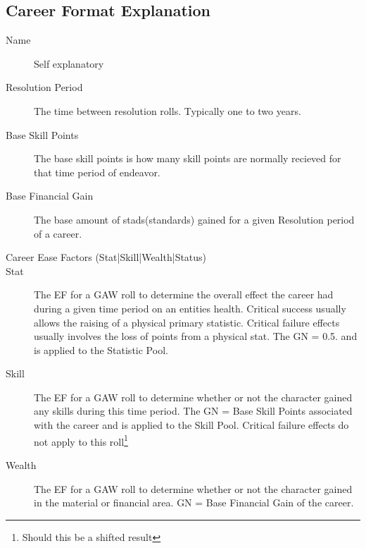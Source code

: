 \subsection{Career Format Explanation}
\begin{description}
	\item [Name]
	Self explanatory
	\item [Resolution Period]
	The time between resolution rolls. Typically one to two years.
	\item[Base Skill Points]
	The base skill points is how many skill points are
	normally recieved for that time period of endeavor.
	\item[Base Financial Gain]
	The base amount of stads(standards) gained for a given Resolution
	period of a career.
	\item[Career Ease Factors (Stat|Skill|Wealth|Status)]
	\item[Stat]
	The EF for a GAW roll to determine the overall effect the career
	had during a given time period on an entities health. Critical
	success usually allows the raising of a physical primary
	statistic. Critical failure effects usually involves the loss of
	points from a physical stat. The GN = 0.5. and is applied to the 
	Statistic Pool.
	\item[Skill]
	The EF for a GAW roll to determine whether or not the character
	gained any skills during this time period. The GN = Base Skill 
	Points associated with the career and is applied to the Skill 
	Pool. Critical failure effects do not apply to this
	roll\footnote{Should this be a shifted result}

	\item[Wealth]
	The EF for a GAW roll to determine whether or not the character
	gained in the material or financial area. GN = Base Financial 
	Gain of the career. 


\end{description}
